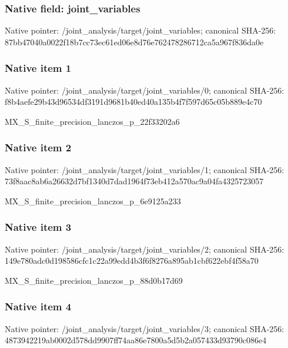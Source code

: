 \documentclass[10pt,a4paper]{article}
\begin{document}
\subsubsection{Native field: joint\_\allowbreak{}variables}
Native pointer: /joint\_\allowbreak{}analysis/target/joint\_\allowbreak{}variables; canonical SHA-256: 87bb47040a0022f18b7cc73ec61ed06e8d76e762478286712ca5a967f836da0e

\subsubsection{Native item 1}
Native pointer: /joint\_\allowbreak{}analysis/target/joint\_\allowbreak{}variables/0; canonical SHA-256: f8b4aefe29b43d96534df3191d9681b40ed40a135b4f7f597d65c05b889e4c70

\begingroup\raggedright\sloppy MX\_\allowbreak{}S\_\allowbreak{}finite\_\allowbreak{}precision\_\allowbreak{}lanczos\_\allowbreak{}p\_\allowbreak{}22f33202a6\par\endgroup

\subsubsection{Native item 2}
Native pointer: /joint\_\allowbreak{}analysis/target/joint\_\allowbreak{}variables/1; canonical SHA-256: 73f8aac8ab6a26632d7bf1340d7dad1964f73eb412a570ac9a04fa4325723057

\begingroup\raggedright\sloppy MX\_\allowbreak{}S\_\allowbreak{}finite\_\allowbreak{}precision\_\allowbreak{}lanczos\_\allowbreak{}p\_\allowbreak{}6e9125a233\par\endgroup

\subsubsection{Native item 3}
Native pointer: /joint\_\allowbreak{}analysis/target/joint\_\allowbreak{}variables/2; canonical SHA-256: 149e780adc0d198586cfc1c22a99edd4b3f6f8276a895ab1cbf622ebf4f58a70

\begingroup\raggedright\sloppy MX\_\allowbreak{}S\_\allowbreak{}finite\_\allowbreak{}precision\_\allowbreak{}lanczos\_\allowbreak{}p\_\allowbreak{}88d0b17d69\par\endgroup

\subsubsection{Native item 4}
Native pointer: /joint\_\allowbreak{}analysis/target/joint\_\allowbreak{}variables/3; canonical SHA-256: 4873942219ab0002d578dd9907ff74aa86e7800a5d5b2a057433d93790c086e4
\end{document}
